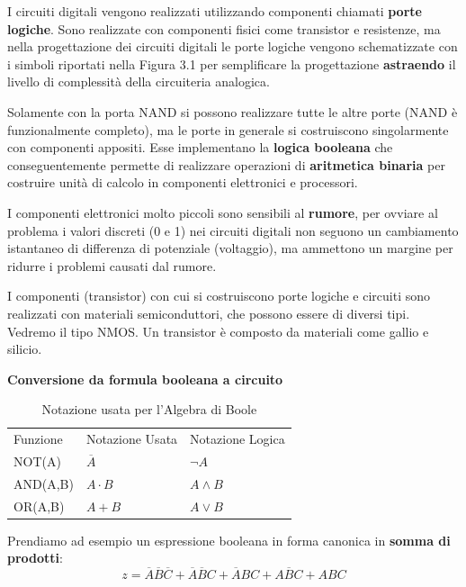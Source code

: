 I circuiti digitali vengono realizzati utilizzando componenti chiamati \textbf{porte logiche}. Sono realizzate con componenti fisici come transistor e resistenze, ma nella progettazione dei circuiti digitali le porte logiche vengono schematizzate con i simboli riportati nella Figura 3.1 per semplificare la progettazione \textbf{astraendo} il livello di complessità della circuiteria analogica.


Solamente con la porta NAND si possono realizzare tutte le altre porte (NAND è funzionalmente completo), ma le porte in generale si costruiscono singolarmente con componenti appositi. Esse implementano la \textbf{logica booleana} che conseguentemente permette di realizzare operazioni di \textbf{aritmetica binaria} per costruire unità di calcolo in componenti elettronici e processori.



I componenti elettronici molto piccoli sono sensibili al \textbf{rumore}, per ovviare al problema i valori discreti (0 e 1) nei circuiti digitali non seguono un cambiamento istantaneo di differenza di potenziale (voltaggio), ma ammettono un margine per ridurre i problemi causati dal rumore.


I componenti (transistor) con cui si costruiscono porte logiche e circuiti sono realizzati con materiali semiconduttori, che possono essere di diversi tipi. Vedremo il tipo NMOS. Un transistor è composto da materiali come gallio e silicio.






\clearpage

\begin{defn}
	\textbf{Conversione da formula booleana a circuito}
	
	
	
	\begin{table}[H]
		\centering
		\caption{Notazione usata per l'Algebra di Boole}
		\label{tab:notazione-booleana}
		\begin{tabular}{|l|l|l|}
			\hline
			Funzione & Notazione Usata & Notazione Logica \\ 
			NOT(A)   & $\overbar{A}$   & $\lnot A$        \\ 
			AND(A,B) & $A \cdot B$     & $A \land B$      \\ 
			OR(A,B)  & $A + B$         & $A \lor B$       \\ \hline
		\end{tabular}
	\end{table}
	
	Prendiamo ad esempio un espressione booleana in forma canonica in \textbf{somma di prodotti}:
	\[ z = \overbar{A}\overbar{B}\overbar{C} + \overbar{A}\overbar{B}C + \overbar{A}BC + A\overbar{B}C + ABC \]
\end{defn}



